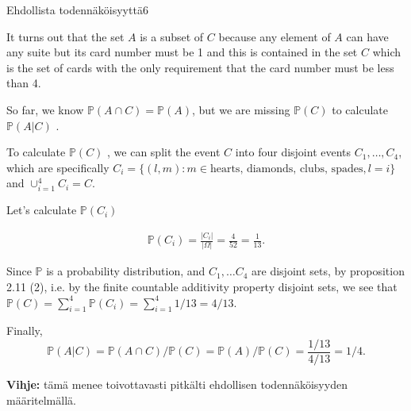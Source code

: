 \documentclass[11pt,a4paper]{amsart}
\newcommand{\1}{\mathbf{1}}
\renewcommand{\P}{\mathbb P}
\begin{document}
\begin{Exercises}{Ehdollista todennäköisyyttä}{6}
\begin{enumerate}
    It turns out that the set $ A$ is a subset of  $ C$  because any element of $ A$  can have any
    suite but its card number must be 1 and this is contained in the set $ C$  which is the set of
    cards with the only requirement that the card number must be less than 4. 

    So far, we know $ \P(A \cap C) = \P(A)$, but we are missing $ \P(C)$  to calculate $ \P(A|C)$ . 

    To calculate $ \P(C)$ , we can split the event $ C$  into four disjoint events $ C_{1} , \dots,
    C_{4} $, which are specifically $ C_{i} = \{ (l,m): m \in \mbox{hearts, diamonds, clubs, spades}, l = i \} $ 
    and $ \cup_{i=1}^{4} C_{i} = C$. 

    Let's calculate $ \P(C_{i})$ 

    \begin{align*}
	\P(C_{i}) = \frac{|C_{i}|}{ |\Omega|} = \frac{4}{52} = \frac{1}{13} .   
    \end{align*}

    Since $ \P$ is a probability distribution, and $ C_{1}, \dots C_{4} $ are disjoint sets, by
    proposition 2.11 (2), i.e. by the finite countable additivity property disjoint sets, we see
    that $ \P(C) = \sum_{i=1}^{4} \P(C_{i} ) = \sum_{i=1}^{4} 1/13 = 4/13  $.  

    Finally,
   \[
        \P(A|C) = \P(A \cap C)/\P(C) = \P(A) / \P(C) = \frac{1/13}{4/13} =  1/4
   .\]  
\end{enumerate}

{\bf Vihje:}  tämä menee toivottavasti pitkälti ehdollisen todennäköisyyden määritelmällä.
\end{Exercises}
\end{document}
